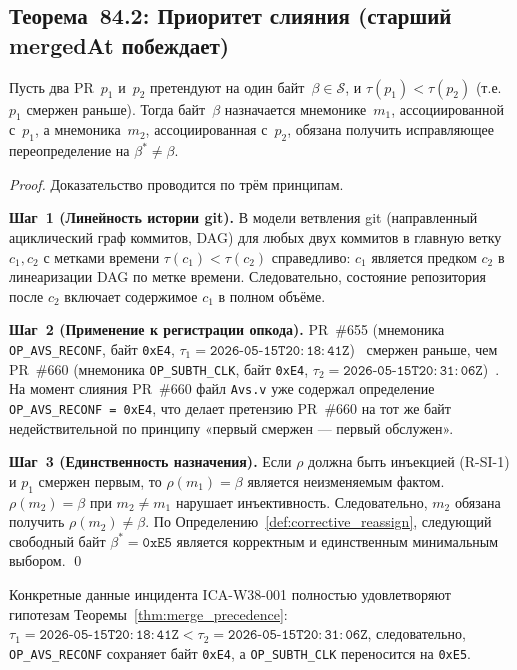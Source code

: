 \subsection{Теорема~84.2: Приоритет слияния (старший mergedAt побеждает)}

\begin{theorem}
\label{thm:merge_precedence}
Пусть два PR~$p_1$ и~$p_2$ претендуют на один байт~$\beta \in \mathcal{S}$,
и $\tau(p_1) < \tau(p_2)$ (т.е.\ $p_1$ смержен раньше).
Тогда байт~$\beta$ назначается мнемонике~$m_1$, ассоциированной с~$p_1$,
а мнемоника~$m_2$, ассоциированная с~$p_2$, обязана получить
исправляющее переопределение на $\beta^* \neq \beta$.
\end{theorem}

\begin{proof}
Доказательство проводится по трём принципам.

\medskip
\noindent\textbf{Шаг~1 (Линейность истории git).}
В модели ветвления git (направленный ациклический граф коммитов,
DAG) для любых двух коммитов в главную ветку $c_1, c_2$
с метками времени $\tau(c_1) < \tau(c_2)$ справедливо:
$c_1$ является предком $c_2$ в линеаризации DAG по метке времени.
Следовательно, состояние репозитория после $c_2$ включает
содержимое $c_1$ в полном объёме.

\medskip
\noindent\textbf{Шаг~2 (Применение к регистрации опкода).}
PR~\#655 (мнемоника \texttt{OP\_AVS\_RECONF}, байт \texttt{0xE4},
$\tau_1 = \mathtt{2026\text{-}05\text{-}15T20:18:41Z}$)~\cite{pr655_t27}
смержен раньше, чем PR~\#660
(мнемоника \texttt{OP\_SUBTH\_CLK}, байт \texttt{0xE4},
$\tau_2 = \mathtt{2026\text{-}05\text{-}15T20:31:06Z}$)~\cite{pr660_t27}.
На момент слияния PR~\#660 файл \texttt{Avs.v} уже содержал
определение \texttt{OP\_AVS\_RECONF = 0xE4},
что делает претензию PR~\#660 на тот же байт
недействительной по принципу «первый смержен — первый обслужен».

\medskip
\noindent\textbf{Шаг~3 (Единственность назначения).}
Если $\rho$ должна быть инъекцией (R-SI-1) и $p_1$ смержен первым,
то $\rho(m_1) = \beta$ является неизменяемым фактом.
$\rho(m_2) = \beta$ при $m_2 \neq m_1$ нарушает инъективность.
Следовательно, $m_2$ обязана получить $\rho(m_2) \neq \beta$.
По Определению~\ref{def:corrective_reassign},
следующий свободный байт $\beta^* = \mathtt{0xE5}$ является
корректным и единственным минимальным выбором.
\qed
\end{proof}

\begin{corollary}
\label{cor:ica_timing}
Конкретные данные инцидента ICA-W38-001 полностью удовлетворяют
гипотезам Теоремы~\ref{thm:merge_precedence}:
$\tau_1 = \mathtt{2026\text{-}05\text{-}15T20:18:41Z} <
\tau_2 = \mathtt{2026\text{-}05\text{-}15T20:31:06Z}$,
следовательно, \texttt{OP\_AVS\_RECONF} сохраняет байт \texttt{0xE4},
а \texttt{OP\_SUBTH\_CLK} переносится на \texttt{0xE5}.
\end{corollary}

